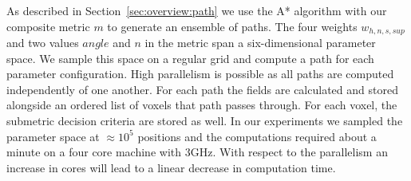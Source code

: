  As described in Section~\ref{sec:overview:path} we use the A* algorithm with our composite metric $m$ to generate an ensemble of paths. The four weights $w_{h,n,s,sup}$ and two values $angle$ and $n$ in the metric span a six-dimensional parameter space. We sample this space on a regular grid and compute a path for each parameter configuration. High parallelism is possible as all paths are computed independently of one another. For each path the fields are calculated and stored alongside an ordered list of voxels that path passes through. For each voxel, the submetric decision criteria are stored as well. In our experiments we sampled the parameter space at $\approx 10^5$ positions and the computations required about a minute on a four core machine with $3$GHz. With respect to the parallelism an increase in cores will lead to a linear decrease in computation time. 